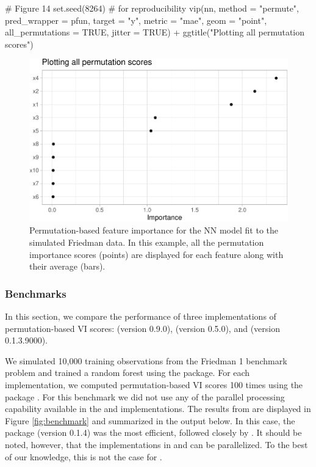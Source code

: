 \begin{Schunk}
\begin{Sinput}
# Figure 14
set.seed(8264)  # for reproducibility
vip(nn, method = "permute", pred_wrapper = pfun, target = "y", metric = "mae", 
    geom = "point", all_permutations = TRUE, jitter = TRUE) +
  ggtitle("Plotting all permutation scores")
\end{Sinput}
\begin{figure}[!htb]

{\centering \includegraphics[width=0.7\linewidth]{greenwell-boehmke_files/figure-latex/vip-nn-mae-all-1} 

}

\caption[Permutation-based feature importance for the NN model fit to the simulated Friedman data]{Permutation-based feature importance for the NN model fit to the simulated Friedman data. In this example, all the permutation importance scores (points) are displayed for each feature along with their average (bars).}\label{fig:vip-nn-mae-all}
\end{figure}
\end{Schunk}

\subsubsection{Benchmarks}

In this section, we compare the performance of three implementations of
permutation-based VI scores:  (version 0.9.0),
 (version 0.5.0), and
 (version 0.1.3.9000).

We simulated 10,000 training observations from the Friedman 1 benchmark
problem and trained a random forest using the  package. For
each implementation, we computed permutation-based VI scores 100 times
using the  package \citep{R-microbenchmark}. For
this benchmark we did not use any of the parallel processing capability
available in the  and  implementations. The results
from  are displayed in Figure \ref{fig:benchmark}
and summarized in the output below. In this case, the  package
(version 0.1.4) was the most efficient, followed closely by
. It should be noted, however, that the implementations
in  and  can be parallelized. To the best of our
knowledge, this is not the case for .

